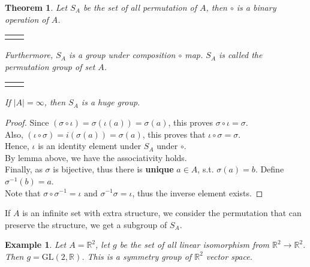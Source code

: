\documentclass{article}
\theoremstyle{MyNonumberplain}
\theoremstyle{break}
\newtheorem*{proof}{Proof. }
\newcommand{\nline}{\begin{tabular}{ll}&\\\end{tabular}}
\newcommand{\infixand}{\text{ and }}
\theoremstyle{break}
\newtheorem{theorem}{Theorem}[section]
\newtheorem{example}{Example}[section]
\theoremstyle{break}
\theoremstyle{definition}
\theoremstyle{break}
\begin{document}
\begin{thmbox}
    \begin{theorem}
        Let $S_A$ be the set of all permutation of $A$, then $\circ$ is a binary
        operation of $A$.

        \nline

        Furthermore, $S_A$ is a group under composition $\circ$ map. $S_A$ is called the permutation group of set $A$.

        \nline

        If $| A | = \infty$, then $S_A$ is a huge group.
    \end{theorem}
    \begin{prfbox}
        \begin{proof}
            Since $(\sigma \circ \iota) = \sigma (\iota (a)) = \sigma (a)$, this
            proves $\sigma \circ \iota = \sigma$.\\

            Also, $(\iota \circ \sigma) = i (\sigma (a)) = \sigma (a)$, this proves that
            $\iota \circ \sigma = \sigma$.\\

            Hence, $\iota$ is an identity element under $S_A$ under $\circ$.\\

            By lemma above, we have the associativity holds.\\

            Finally, as $\sigma$ is bijective, thus there is \textbf{unique} $a \in A$, s.t. $\sigma (a)
            = b$. Define $\sigma^{- 1} (b) = a$.\\

            Note that $\sigma \circ \sigma^{- 1} = \iota \infixand \sigma^{- 1} \sigma =
            \iota$, thus the inverse element exists.
        \end{proof}
    \end{prfbox}
\end{thmbox}

If $A$ is an infinite set with extra structure, we consider the permutation that can preserve the structure, we get a subgroup of $S_A$. 

\begin{expbox}
    \begin{example}
        Let $A =\mathbb{R}^2$, let $g$ be the set of all linear isomorphism from
        $\mathbb{R}^2 \to \mathbb{R}^2$. Then $g = \text{GL} (2, \mathbb{R})$.
        This is a symmetry group of $\mathbb{R}^2$ vector space. 
    \end{example}
\end{expbox}
\end{document}
